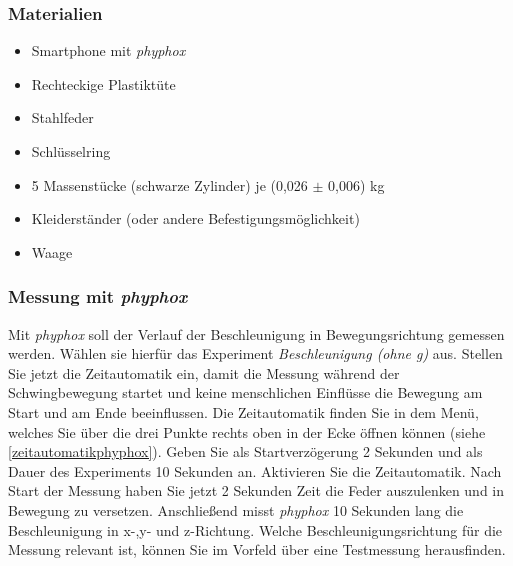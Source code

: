 \documentclass[12pt]{scrbook}
\begin{document}
\subsubsection{Materialien}
\begin{itemize}
    \item Smartphone mit \textit{phyphox}
    \item Rechteckige Plastiktüte
    \item Stahlfeder
    \item Schlüsselring 
    \item 5 Massenstücke (schwarze Zylinder) je (0,026 $\pm$ 0,006) kg
    \item Kleiderständer (oder andere Befestigungsmöglichkeit)
    \item Waage
\end{itemize}

\subsubsection{Messung mit \textit{phyphox}}

Mit \textit{phyphox} soll der Verlauf der Beschleunigung in Bewegungsrichtung gemessen werden.  Wählen sie hierfür das Experiment \textit{Beschleunigung (ohne g)} aus. Stellen Sie jetzt die Zeitautomatik ein, damit die Messung während der Schwingbewegung startet und keine menschlichen Einflüsse die Bewegung am Start und am Ende beeinflussen. Die Zeitautomatik finden Sie in dem Menü, welches Sie über die drei Punkte rechts oben in der Ecke öffnen können (siehe \autoref{zeitautomatikphyphox}). Geben Sie als Startverzögerung 2 Sekunden und als Dauer des Experiments 10 Sekunden an. Aktivieren Sie die Zeitautomatik. Nach Start der Messung haben Sie jetzt 2 Sekunden Zeit die Feder auszulenken und in Bewegung zu versetzen. Anschließend misst \textit{phyphox} 10 Sekunden lang die Beschleunigung in x-,y- und z-Richtung. Welche Beschleunigungsrichtung für die Messung relevant ist, können Sie im Vorfeld über eine Testmessung herausfinden.
\end{document}
